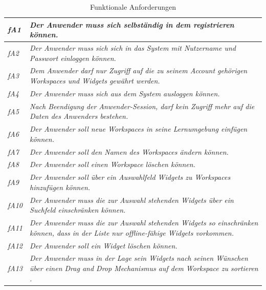\renewcommand{\arraystretch}{1.4} 
\begin{table}[h]
\caption{Funktionale Anforderungen}
\begin{tabularx}{\textwidth}{ l | X }
\emph{fA1} & \emph{Der Anwender muss sich selbständig in dem registrieren können.} \\ \hline
\emph{fA2} & \emph{Der Anwender muss sich sich in das System mit Nutzername und Passwort einloggen können.} \\ \hline
\emph{fA3} & \emph{Dem Anwender darf nur Zugriff auf die zu seinem Account gehörigen Workspaces und Widgets gewährt werden.} \\ \hline
\emph{fA4} & \emph{Der Anwender muss sich aus dem System ausloggen können.} \\ \hline
\emph{fA5} & \emph{Nach Beendigung der Anwender-Session, darf kein Zugriff mehr auf die Daten des Anwenders bestehen.} \\ \hline
\emph{fA6} & \emph{Der Anwender soll neue Workspaces in seine Lernumgebung einfügen können.} \\ \hline
\emph{fA7} & \emph{Der Anwender soll den Namen des Workspaces ändern können.} \\ \hline
\emph{fA8} & \emph{Der Anwender soll einen Workspace löschen können.} \\ \hline
\emph{fA9} & \emph{Der Anwender soll über ein Auswahlfeld Widgets zu Workspaces hinzufügen können.} \\ \hline
\emph{fA10} & \emph{Der Anwender muss die zur Auswahl stehenden Widgets über ein Suchfeld einschränken können.} \\ \hline
\emph{fA11} & \emph{Der Anwender muss die zur Auswahl stehenden Widgets so einschränken können, dass in der Liste nur offline-fähige Widgets vorkommen.} \\ \hline
\emph{fA12} & \emph{Der Anwender soll ein Widget löschen können.} \\\hline
\emph{fA13} & \emph{Der Anwender muss in der Lage sein Widgets nach seinen Wünschen über einen Drag and Drop Mechanismus auf dem Workspace zu sortieren .} \\ \hline
\end{tabularx}
\label{table:funktionale_anforderungen}
\end{table}

